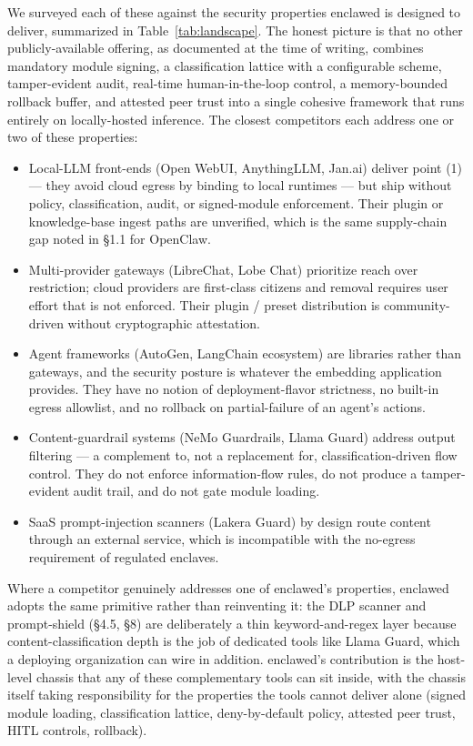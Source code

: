 \documentclass[11pt]{article}
\begin{document}
We surveyed each of these against the security properties enclawed is
designed to deliver, summarized in Table~\ref{tab:landscape}. The
honest picture is that no other publicly-available offering, as
documented at the time of writing, combines mandatory module signing,
a classification lattice with a configurable scheme, tamper-evident
audit, real-time human-in-the-loop control, a memory-bounded rollback
buffer, and attested peer trust into a single cohesive framework that
runs entirely on locally-hosted inference. The closest competitors
each address one or two of these properties:

\begin{itemize}
  \item Local-LLM front-ends (Open WebUI, AnythingLLM, Jan.ai) deliver
    point (1) --- they avoid cloud egress by binding to local runtimes
    --- but ship without policy, classification, audit, or
    signed-module enforcement. Their plugin or knowledge-base ingest
    paths are unverified, which is the same supply-chain gap noted in
    §1.1 for OpenClaw.
  \item Multi-provider gateways (LibreChat, Lobe Chat) prioritize
    reach over restriction; cloud providers are first-class citizens
    and removal requires user effort that is not enforced. Their
    plugin / preset distribution is community-driven without
    cryptographic attestation.
  \item Agent frameworks (AutoGen, LangChain ecosystem) are libraries
    rather than gateways, and the security posture is whatever the
    embedding application provides. They have no notion of
    deployment-flavor strictness, no built-in egress allowlist, and
    no rollback on partial-failure of an agent's actions.
  \item Content-guardrail systems (NeMo Guardrails, Llama Guard)
    address output filtering --- a complement to, not a replacement
    for, classification-driven flow control. They do not enforce
    information-flow rules, do not produce a tamper-evident audit
    trail, and do not gate module loading.
  \item SaaS prompt-injection scanners (Lakera Guard) by design route
    content through an external service, which is incompatible with
    the no-egress requirement of regulated enclaves.
\end{itemize}

Where a competitor genuinely addresses one of enclawed's properties,
enclawed adopts the same primitive rather than reinventing it: the DLP
scanner and prompt-shield (§4.5, §8) are deliberately a thin
keyword-and-regex layer because content-classification depth is the
job of dedicated tools like Llama Guard, which a deploying
organization can wire in addition. enclawed's contribution is the
host-level chassis that any of these complementary tools can sit
inside, with the chassis itself taking responsibility for the
properties the tools cannot deliver alone (signed module loading,
classification lattice, deny-by-default policy, attested peer trust,
HITL controls, rollback).
\end{document}
